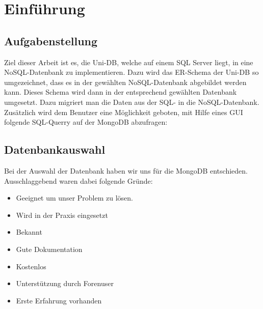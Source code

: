 \section{Einführung}

\subsection{Aufgabenstellung}
Ziel dieser Arbeit ist es, die Uni-DB, welche auf einem SQL Server liegt, in eine NoSQL-Datenbank zu implementieren. Dazu wird das ER-Schema der Uni-DB so umgezeichnet, dass es in der gewählten NoSQL-Datenbank abgebildet werden kann. Dieses Schema wird dann in der entsprechend gewählten Datenbank umgesetzt. Dazu migriert man die Daten aus der SQL- in die NoSQL-Datenbank.
Zusätzlich wird dem Benutzer eine Möglichkeit geboten, mit Hilfe eines GUI folgende SQL-Querry auf der MongoDB abzufragen:




\newpage
\subsection{Datenbankauswahl}
Bei der Auswahl der Datenbank haben wir uns für die MongoDB entschieden. Ausschlaggebend waren dabei folgende Gründe:
\begin{itemize}
  \item Geeignet um unser Problem zu lösen.
  \item Wird in der Praxis eingesetzt
  \item Bekannt
  \item Gute Dokumentation
  \item Kostenlos
  \item Unterstützung durch Forenuser
  \item Erste Erfahrung vorhanden
\end{itemize}

